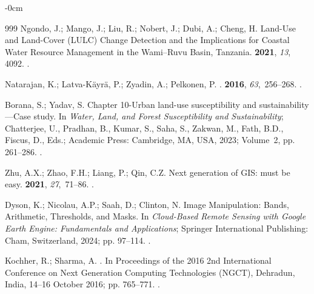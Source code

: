 \documentclass[jimaging,article,accept,pdftex,moreauthors]{Definitions/mdpi}
\begin{document}
\begin{adjustwidth}{-\extralength}{0cm}
\begin{thebibliography}{999}
Ngondo, J.; Mango, J.; Liu, R.; Nobert, J.; Dubi, A.; Cheng, H.
\newblock Land-Use and Land-Cover (LULC) Change Detection and the Implications
  for Coastal Water Resource Management in the Wami–Ruvu Basin, Tanzania.
 {\bf 2021}, {\em 13}, 4092.
.

Natarajan, K.; Latva-Käyrä, P.; Zyadin, A.; Pelkonen, P.
.
 {\bf 2016}, {\em
  63},~256--268.
.

Borana, S.; Yadav, S.
\newblock Chapter 10-Urban land-use susceptibility and sustainability---Case
  study. In {\em Water, Land, and Forest Susceptibility and Sustainability};
  Chatterjee, U., Pradhan, B., Kumar, S., Saha, S., Zakwan, M., Fath, B.D.,
  Fiscus, D., Eds.; Academic Press: Cambridge, MA, USA, 
  2023; Volume~2, %
 pp. 261--286.
.

Zhu, A.X.; Zhao, F.H.; Liang, P.; Qin, C.Z.
\newblock Next generation of GIS: must be easy.
 {\bf 2021}, {\em 27},~71--86.
.

Dyson, K.; Nicolau, A.P.; Saah, D.; Clinton, N. Image Manipulation: Bands,
  Arithmetic, Thresholds, and Masks.
\newblock In {\em Cloud-Based Remote Sensing with Google Earth Engine:
  Fundamentals and Applications}; Springer International Publishing: Cham, Switzerland,
  2024; pp. 97--114.
.

Kochher, R.; Sharma, A.
.
\newblock In Proceedings of the 2016 2nd International Conference on Next
  Generation Computing Technologies (NGCT), Dehradun, India, 14--16 October 2016; pp. 765--771.
.


\end{thebibliography}
\end{adjustwidth}
\end{document}
